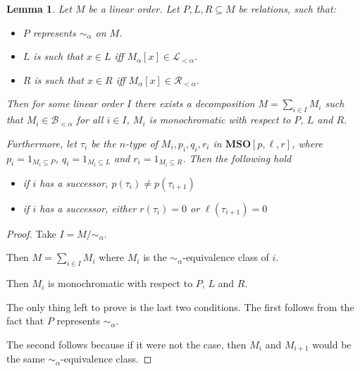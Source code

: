 \documentclass{article}
\newtheorem{lemma}{Lemma}
\newcommand{\mso}{\mathbf{MSO}}
\begin{document}
\begin{lemma}
  Let $M$ be a linear order. Let $P, L, R \subseteq M$ be relations, such that:

  \begin{itemize}
    \item $P$ represents $\sim_{\alpha}$ on $M$.
    \item $L$ is such that $x \in L$ iff $M_{\alpha}[x] \in \mathcal{L}_{< \alpha}$.
    \item $R$ is such that $x \in R$ iff $M_{\alpha}[x] \in \mathcal{R}_{< \alpha}$.
  \end{itemize}

  Then for some linear order $I$ there exists a decomposition
  $M = \sum_{i \in I} M_i$ such that $M_i \in \mathcal{B}_{< \alpha}$ for all $i \in I$,
  $M_i$ is monochromatic with respect to $P$, $L$ and $R$.

  Furthermore, let $\tau_i$ be the $n$-type of $M_i, p_i, q_i, r_i$ in $\mso[p, \ell, r]$,
  where $p_i = 1_{M_i \subseteq P}$, $q_i = 1_{M_i \subseteq L}$ and $r_i = 1_{M_i \subseteq R}$.
  Then the following hold
  \begin{itemize}
    \item if $i$ has a successor, $p(\tau_i) \ne p(\tau_{i+1})$
    \item if $i$ has a successor, either $r(\tau_i) = 0$ or $\ell(\tau_{i+1}) = 0$
  \end{itemize}
\end{lemma}
\begin{proof}
  Take $I = M / \sim_{\alpha}$.

  Then $M = \sum_{i \in I} M_i$ where $M_i$ is the $\sim_{\alpha}$-equivalence class of $i$.

  Then $M_i$ is monochromatic with respect to $P$, $L$ and $R$.

  The only thing left to prove is the last two conditions. The first follows from
  the fact that $P$ represents $\sim_{\alpha}$.

  The second follows because if it were not the case, then $M_i$ and $M_{i+1}$ would
  be the same $\sim_{\alpha}$-equivalence class.
\end{proof}
\end{document}
